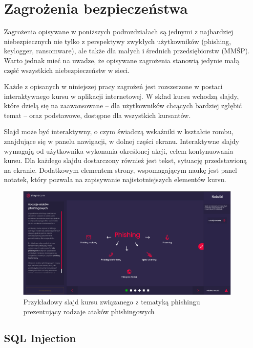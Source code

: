 \documentclass[12pt,twoside]{article}
\begin{document}
\clearpage
\section{Zagrożenia bezpieczeństwa}

Zagrożenia opisywane w poniższych podrozdziałach są jednymi z najbardziej niebezpiecznych nie tylko z perspektywy zwykłych użytkowników (phishing, keylogger, ransomware), ale także dla małych i średnich przedsiębiorstw (MMŚP). Warto jednak mieć na uwadze, że opisywane zagrożenia stanowią jedynie małą część wszystkich niebezpieczeństw w sieci.

Każde z opisanych w niniejszej pracy zagrożeń jest rozszerzone w postaci interaktywnego kursu w aplikacji internetowej. W skład kursu wchodzą slajdy, które dzielą się na zaawansowane -- dla użytkowników chcących bardziej zgłębić temat -- oraz podstawowe, dostępne dla wszystkich kursantów. 

Slajd może być interaktywny, o czym świadczą wskaźniki w kształcie rombu, znajdujące się w panelu nawigacji, w dolnej części ekranu. Interaktywne slajdy wymagają od użytkownika wykonania określonej akcji, celem kontynuowania kursu. Dla każdego slajdu dostarczony również jest tekst, sytuację przedstawioną na ekranie. Dodatkowym elementem strony, wspomagającym naukę jest panel notatek, który pozwala na zapisywanie najistotniejszych elementów kursu.

\begin{figure}[H]
	\centering
	\includegraphics[width=1\linewidth]{figures/slide-tutorial}
	\caption{Przykładowy slajd kursu związanego z tematyką phishingu prezentujący rodzaje ataków phishingowych}
\end{figure}

\clearpage
\subsection{SQL Injection}
\end{document}
